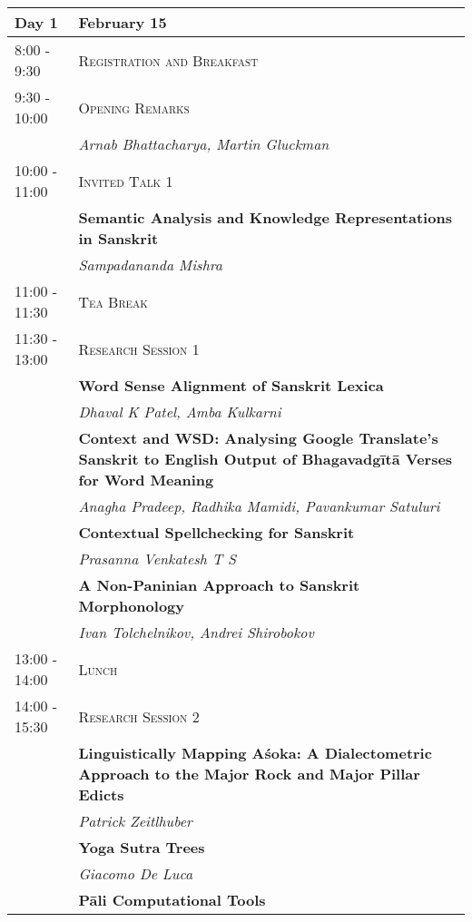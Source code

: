 \bgroup
\def\arraystretch{1.5}
\begin{longtable}{|p{}|p{}|}
\hline
\rowcolor{Snow4!30!} Day 1 & \textbf{February 15}\\
\hline
\rowcolor{Gold1!45!} 8:00  - 9:30 & \textsc{Registration and Breakfast}\\*
\hline
\rowcolor{RosyBrown3!45!} 9:30  - 10:00 & \textsc{Opening Remarks}\\*
\hline
 & \textit{Arnab Bhattacharya, Martin Gluckman}\\
\hline
\rowcolor{SeaGreen3!45!} 10:00  - 11:00 & \textsc{Invited Talk 1}\\*
\hline
 & \textbf{Semantic Analysis and Knowledge Representations in Sanskrit}\\*
 & \textit{Sampadananda Mishra}\\
\hline
\rowcolor{Gold1!45!} 11:00  - 11:30 & \textsc{Tea Break}\\*
\hline
\rowcolor{OliveDrab3!45!} 11:30  - 13:00 & \textsc{Research Session 1}\\*
\hline
 & \textbf{Word Sense Alignment of Sanskrit Lexica}\\*
 & \textit{Dhaval K Patel, Amba Kulkarni}\\
\hline
 & \textbf{Context and WSD: Analysing Google Translate's Sanskrit to English Output of Bhagavadgītā Verses for Word Meaning}\\*
 & \textit{Anagha Pradeep, Radhika Mamidi, Pavankumar Satuluri}\\
\hline
 & \textbf{Contextual Spellchecking for Sanskrit}\\*
 & \textit{Prasanna Venkatesh T S}\\
\hline
 & \textbf{A Non-Paninian Approach to Sanskrit Morphonology}\\*
 & \textit{Ivan Tolchelnikov, Andrei Shirobokov}\\
\hline
\rowcolor{Gold1!45!} 13:00  - 14:00 & \textsc{Lunch}\\*
\hline
\rowcolor{OliveDrab3!45!} 14:00  - 15:30 & \textsc{Research Session 2}\\*
\hline
 & \textbf{Linguistically Mapping Aśoka: A Dialectometric Approach to the Major Rock and Major Pillar Edicts}\\*
 & \textit{Patrick Zeitlhuber}\\
\hline
 & \textbf{Yoga Sutra Trees}\\*
 & \textit{Giacomo De Luca}\\
\hline
 & \textbf{Pāli Computational Tools}\\*

\end{longtable}
